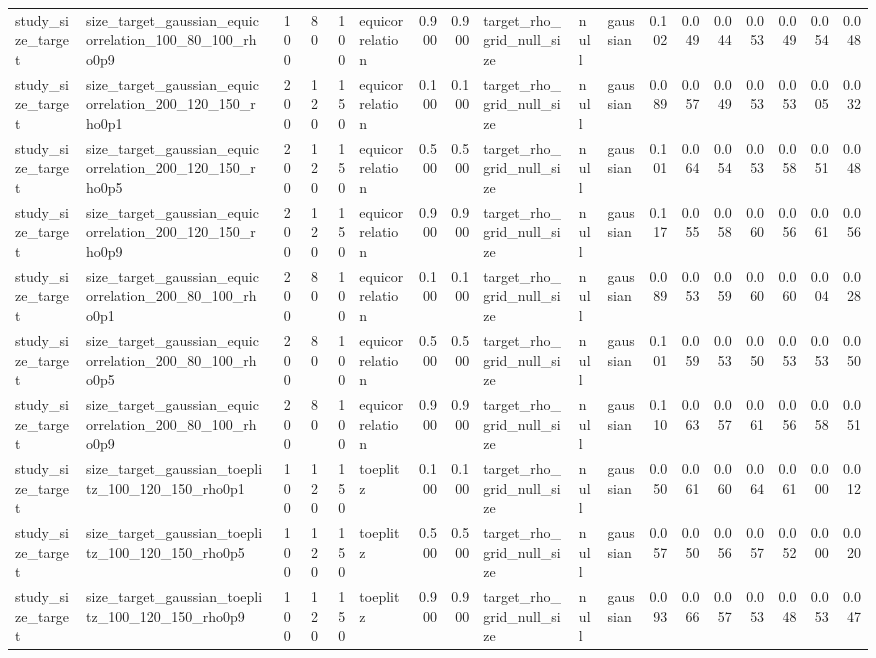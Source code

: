 \begin{tabular}{llrrrlrrlllrrrrrrr}
study\_size\_target & size\_target\_gaussian\_equicorrelation\_100\_80\_100\_rho0p9 & 100 & 80 & 100 & equicorrelation & 0.900 & 0.900 & target\_rho\_grid\_null\_size & null & gaussian & 0.102 & 0.049 & 0.044 & 0.053 & 0.049 & 0.054 & 0.048 \\
study\_size\_target & size\_target\_gaussian\_equicorrelation\_200\_120\_150\_rho0p1 & 200 & 120 & 150 & equicorrelation & 0.100 & 0.100 & target\_rho\_grid\_null\_size & null & gaussian & 0.089 & 0.057 & 0.049 & 0.053 & 0.053 & 0.005 & 0.032 \\
study\_size\_target & size\_target\_gaussian\_equicorrelation\_200\_120\_150\_rho0p5 & 200 & 120 & 150 & equicorrelation & 0.500 & 0.500 & target\_rho\_grid\_null\_size & null & gaussian & 0.101 & 0.064 & 0.054 & 0.053 & 0.058 & 0.051 & 0.048 \\
study\_size\_target & size\_target\_gaussian\_equicorrelation\_200\_120\_150\_rho0p9 & 200 & 120 & 150 & equicorrelation & 0.900 & 0.900 & target\_rho\_grid\_null\_size & null & gaussian & 0.117 & 0.055 & 0.058 & 0.060 & 0.056 & 0.061 & 0.056 \\
study\_size\_target & size\_target\_gaussian\_equicorrelation\_200\_80\_100\_rho0p1 & 200 & 80 & 100 & equicorrelation & 0.100 & 0.100 & target\_rho\_grid\_null\_size & null & gaussian & 0.089 & 0.053 & 0.059 & 0.060 & 0.060 & 0.004 & 0.028 \\
study\_size\_target & size\_target\_gaussian\_equicorrelation\_200\_80\_100\_rho0p5 & 200 & 80 & 100 & equicorrelation & 0.500 & 0.500 & target\_rho\_grid\_null\_size & null & gaussian & 0.101 & 0.059 & 0.053 & 0.050 & 0.053 & 0.053 & 0.050 \\
study\_size\_target & size\_target\_gaussian\_equicorrelation\_200\_80\_100\_rho0p9 & 200 & 80 & 100 & equicorrelation & 0.900 & 0.900 & target\_rho\_grid\_null\_size & null & gaussian & 0.110 & 0.063 & 0.057 & 0.061 & 0.056 & 0.058 & 0.051 \\
study\_size\_target & size\_target\_gaussian\_toeplitz\_100\_120\_150\_rho0p1 & 100 & 120 & 150 & toeplitz & 0.100 & 0.100 & target\_rho\_grid\_null\_size & null & gaussian & 0.050 & 0.061 & 0.060 & 0.064 & 0.061 & 0.000 & 0.012 \\
study\_size\_target & size\_target\_gaussian\_toeplitz\_100\_120\_150\_rho0p5 & 100 & 120 & 150 & toeplitz & 0.500 & 0.500 & target\_rho\_grid\_null\_size & null & gaussian & 0.057 & 0.050 & 0.056 & 0.057 & 0.052 & 0.000 & 0.020 \\
study\_size\_target & size\_target\_gaussian\_toeplitz\_100\_120\_150\_rho0p9 & 100 & 120 & 150 & toeplitz & 0.900 & 0.900 & target\_rho\_grid\_null\_size & null & gaussian & 0.093 & 0.066 & 0.057 & 0.053 & 0.048 & 0.053 & 0.047 \\

\end{tabular}
